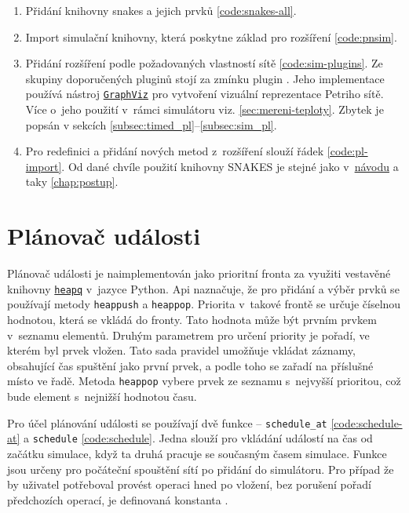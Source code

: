 \begin{enumerate}
  \item Přidání knihovny snakes a jejich prvků \ref{code:snakes-all}.
  \item Import simulační knihovny, která poskytne základ pro rozšíření \ref{code:pnsim}.
  \item Přidání rozšíření podle požadovaných vlastností sítě \ref{code:sim-plugins}. Ze skupiny doporučených pluginů stojí za zmínku plugin \href{https://www.ibisc.univ-evry.fr/~fpommereau/SNAKES/API/plugins/gv.html}{}. Jeho implementace používá nástroj \href{https://www.graphviz.org/}{\texttt{GraphViz}} pro vytvoření vizuální reprezentace Petriho sítě. Více o~jeho použití v~rámci simulátoru viz. \ref{sec:mereni-teploty}. Zbytek je popsán v sekcích \ref{subsec:timed_pl}--\ref{subsec:sim_pl}.
  \item Pro redefinici a přidání nových metod z~rozšíření slouží řádek \ref{code:pl-import}. Od dané chvíle použití knihovny SNAKES je stejné jako v~\href{https://www.ibisc.univ-evry.fr/~fpommereau/SNAKES/first-steps-with-snakes.html}{návodu} a taky \ref{chap:postup}.
\end{enumerate}


\section{Plánovač události}
\label{sec:event-planner}

Plánovač události je naimplementován jako prioritní fronta za využiti vestavěné knihovny \href{https://docs.python.org/3/library/heapq.html}{\texttt{heapq}} v~jazyce Python. Api naznačuje, že pro přidání a výběr prvků se používají metody \texttt{heappush} a \texttt{heappop}. Priorita v~takové frontě se určuje číselnou hodnotou, která se vkládá do fronty. Tato hodnota může být prvním prvkem v~seznamu elementů. Druhým parametrem pro určení priority je pořadí, ve kterém byl prvek vložen. Tato sada pravidel umožňuje vkládat záznamy, obsahující čas spuštění jako první prvek, a podle toho se zařadí na příslušné místo ve řadě. Metoda \texttt{heappop} vybere prvek ze seznamu s~nejvyšší prioritou, což bude element s~nejnižší hodnotou času.

Pro účel plánování události se používají dvě funkce -- \texttt{schedule\_at} \ref{code:schedule-at} a \texttt{schedule} \ref{code:schedule}. Jedna slouží pro vkládání událostí na čas od začátku simulace, když ta druhá pracuje se současným časem simulace. Funkce jsou určeny pro počáteční spouštění sítí po přidání do simulátoru. Pro případ že by uživatel potřeboval provést operaci hned po vložení, bez porušení pořadí předchozích operací, je definovaná konstanta .


